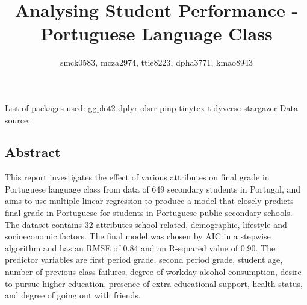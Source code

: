 \documentclass[a4paper,8pt,twocolumn,twoside,]{pinp}
\title{Analysing Student Performance - Portuguese Language Class}
\author[]{smck0583, mcza2974, ttie8223, dpha3771, kmao8943}
\begin{document}
\verticaladjustment{-2pt}

\maketitle
\thispagestyle{firststyle}



List of packages used:
\href{https://cran.r-project.org/package=ggplot2}{ggplot2}\cite{CRAN:ggplot2}
\href{https://cran.r-project.org/package=dplyr}{dplyr}
\href{https://cran.r-project.org/package=olsrr}{olsrr}
\href{https://cran.r-project.org/package=pinp}{pinp}
\href{https://cran.r-project.org/package=tinytex}{tinytex}\citep{CRAN:tinytex}
\href{https://cran.r-project.org/package=tidyverse}{tidyverse}\citep{CRAN:tidyverse}
\href{https://cran.r-project.org/package=stargazer}{stargazer}\citep{CRAN:stargazer}
Data source: \citet{art:UCI}

\hypertarget{abstract}{%
\subsection{Abstract}\label{abstract}}

This report investigates the effect of various attributes on final grade
in Portuguese language class from data of 649 secondary students in
Portugal, and aims to use multiple linear regression to produce a model
that closely predicts final grade in Portuguese for students in
Portuguese public secondary schools. The dataset contains 32 attributes
school-related, demographic, lifestyle and socioeconomic factors. The
final model was chosen by AIC in a stepwise algorithm and has an RMSE of
0.84 and an R-squared value of 0.90. The predictor variables are first
period grade, second period grade, student age, number of previous class
failures, degree of workday alcohol consumption, desire to pursue higher
education, presence of extra educational support, health status, and
degree of going out with friends.
\end{document}
